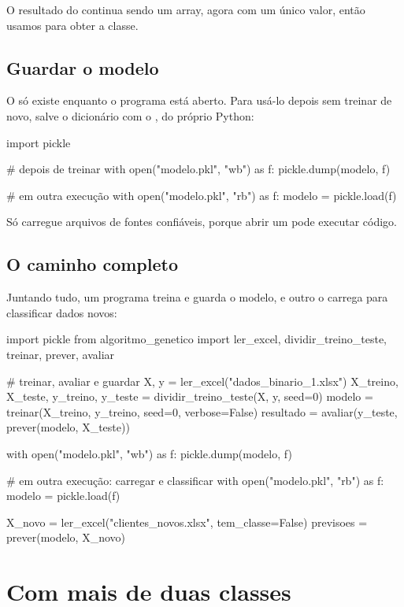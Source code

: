 \documentclass[11pt,a4paper]{article}
\newcommand{\code}[1]{\texttt{\detokenize{#1}}}
\begin{document}
O resultado do \code{prever} continua sendo um array, agora com um único valor, então usamos \code{[0]} para obter a classe.

\subsection{Guardar o modelo}

O \code{modelo} só existe enquanto o programa está aberto. Para usá-lo depois sem treinar de novo, salve o dicionário com o \code{pickle}, do próprio Python:

\begin{py}
import pickle

# depois de treinar
with open("modelo.pkl", "wb") as f:
    pickle.dump(modelo, f)

# em outra execução
with open("modelo.pkl", "rb") as f:
    modelo = pickle.load(f)
\end{py}

\begin{nota}
Só carregue arquivos \code{.pkl} de fontes confiáveis, porque abrir um pode executar código.
\end{nota}

\subsection{O caminho completo}

Juntando tudo, um programa treina e guarda o modelo, e outro o carrega para classificar dados novos:

\begin{py}
import pickle
from algoritmo_genetico import ler_excel, dividir_treino_teste, treinar, prever, avaliar

# treinar, avaliar e guardar
X, y = ler_excel("dados_binario_1.xlsx")
X_treino, X_teste, y_treino, y_teste = dividir_treino_teste(X, y, seed=0)
modelo = treinar(X_treino, y_treino, seed=0, verbose=False)
resultado = avaliar(y_teste, prever(modelo, X_teste))

with open("modelo.pkl", "wb") as f:
    pickle.dump(modelo, f)

# em outra execução: carregar e classificar
with open("modelo.pkl", "rb") as f:
    modelo = pickle.load(f)

X_novo = ler_excel("clientes_novos.xlsx", tem_classe=False)
previsoes = prever(modelo, X_novo)
\end{py}

\clearpage
\section{Com mais de duas classes}
\end{document}
